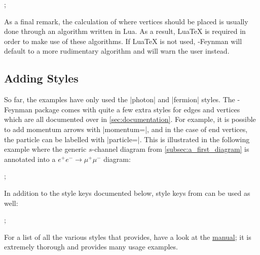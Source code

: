 \documentclass[a4paper,final]{ltxdoc}
\providecommand{\LuaTeX}{Lua\TeX}
\providecommand{\tikzfeynmanname}{\tikzname-Feynman}
\providecommand{\pgfmanual}{\href{http://mirrors.ctan.org/graphics/pgf/base/doc/pgfmanual.pdf}{\tikzname{} manual}}
\begin{document}
\begin{codeexample}[]
;
\end{codeexample}

As a final remark, the calculation of where vertices should be placed is usually
done through an algorithm written in Lua.  As a result, \LuaTeX{} is required in
order to make use of these algorithms.  If \LuaTeX{} is not used,
\tikzfeynmanname{} will default to a more rudimentary algorithm and will warn
the user instead.

\subsection{Adding Styles}
\label{subsec:adding_styles}

So far, the examples have only used the |photon| and |fermion| styles.  The
\tikzfeynmanname{} package comes with quite a few extra styles for edges and
vertices which are all documented over in \cref{sec:documentation}.  For
example, it is possible to add momentum arrows with |momentum=|, and
in the case of end vertices, the particle can be labelled with
|particle=|.  This is illustrated in the following example where the
generic \(s\)-channel diagram from \cref{subsec:a_first_diagram} is annotated
into a \(e^{+}e^{-} \to \mu^{+}\mu^{-}\) diagram:
\begin{codeexample}[]
;
\end{codeexample}
In addition to the style keys documented below, style keys from \tikzname{} can
be used as well:
\begin{codeexample}[]
;
\end{codeexample}
For a list of all the various styles that \tikzname{} provides, have a look at
the \pgfmanual; it is extremely thorough and provides many usage examples.
\end{document}
